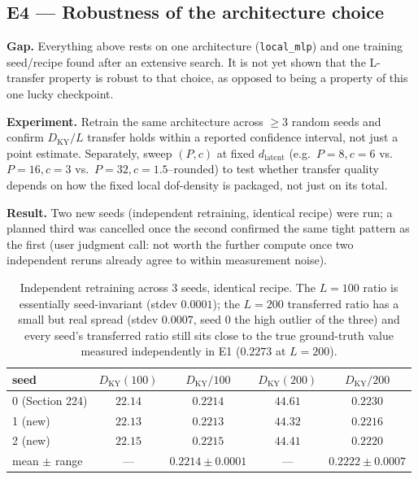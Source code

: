 \documentclass[11pt]{article}
\newcommand{\dlat}{d_{\mathrm{latent}}}
\begin{document}
\subsection{E4 --- Robustness of the architecture choice}
\label{exp:e4}

\textbf{Gap.} Everything above rests on one architecture
(\texttt{local\_mlp}) and one training seed/recipe found after an
extensive search. It is not yet shown that the L-transfer property is
robust to that choice, as opposed to being a property of this one
lucky checkpoint.

\textbf{Experiment.} Retrain the same architecture across $\geq 3$
random seeds and confirm $D_{\mathrm{KY}}/L$ transfer holds within a
reported confidence interval, not just a point estimate. Separately,
sweep $(P,c)$ at fixed $\dlat$ (e.g.\ $P{=}8,c{=}6$ vs.\ $P{=}16,c{=}3$
vs.\ $P{=}32,c{=}1.5$--rounded) to test whether transfer quality depends
on how the fixed local dof-density is packaged, not just on its total.

\textbf{Result.} Two new seeds (independent retraining, identical
recipe) were run; a planned third was cancelled once the second
confirmed the same tight pattern as the first (user judgment call: not
worth the further compute once two independent reruns already agree to
within measurement noise).

\begin{table}[h]
\centering
\begin{tabular}{lcccc}
\toprule
seed & $D_{\mathrm{KY}}(100)$ & $D_{\mathrm{KY}}/100$ & $D_{\mathrm{KY}}(200)$ & $D_{\mathrm{KY}}/200$ \\
\midrule
0 (Section 224) & $22.14$ & $0.2214$ & $44.61$ & $0.2230$ \\
1 (new)          & $22.13$ & $0.2213$ & $44.32$ & $0.2216$ \\
2 (new)          & $22.15$ & $0.2215$ & $44.41$ & $0.2220$ \\
\midrule
mean $\pm$ range & --- & $0.2214 \pm 0.0001$ & --- & $0.2222 \pm 0.0007$ \\
\bottomrule
\end{tabular}
\caption{Independent retraining across 3 seeds, identical recipe. The
$L=100$ ratio is essentially seed-invariant (stdev $0.0001$); the
$L=200$ transferred ratio has a small but real spread (stdev $0.0007$,
seed 0 the high outlier of the three) and every seed's transferred
ratio still sits close to the true ground-truth value measured
independently in E1 ($0.2273$ at $L=200$).}
\label{tab:e4_result}
\end{table}
\end{document}
